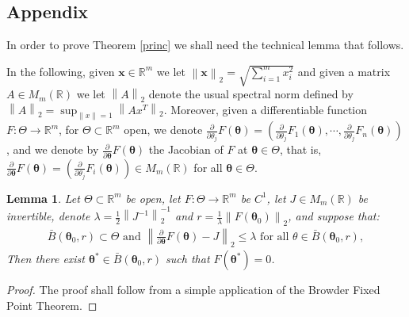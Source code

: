 \documentclass[10pt,a4paper,onecolumn]{article} %
\newtheorem{lemma}[theorem]{Lemma}
\newcommand{\R}{\mathbb{R}}
\newcommand{\bs}{\boldsymbol}
\begin{document}
\begin{appendix}

\section*{Appendix}
In order to prove Theorem \ref{princ} we shall need the technical lemma that follows.

In the following, given $\bs{x}\in \R^m$ we let $\left\|\bs{x}\right\|_2=\sqrt{\sum_{i=1}^m x_i^2}$ and given a matrix $A\in M_m(\R)$ we let $\left\|A\right\|_2$ denote the usual spectral norm defined by $\left\|A\right\|_2=\sup_{\left\|x\right\|=1}\left\|Ax^T\right\|_2$. Moreover, given a differentiable function $F:\Theta\to \mathbb{R}^m$, for $\Theta\subset \mathbb{R}^m$ open, we denote $\frac{\partial}{\partial \theta_j} F(\bs{\theta})=\left(\frac{\partial}{\partial \theta_j} F_1 (\bs{\theta}),\cdots,  \frac{\partial}{\partial \theta_j} F_n (\bs{\theta})\right)$, and we denote
 by $\frac{\partial}{\partial \bs{\theta}} F(\bs{\theta})$ the Jacobian of $F$ at $\bs{\theta}\in \Theta$, that is, $\frac{\partial}{\partial \bs{\theta}} F(\bs{\theta})=\left(\frac{\partial}{\partial \theta_j} F_i (\bs{\theta})\right)\in M_m(\mathbb{R})$ for all $\bs{\theta}\in \Theta$.
 
\begin{lemma}\label{clemma} Let $\Theta\subset \mathbb{R}^m$ be open, let $F:\Theta\to \mathbb{R}^m$ be $C^1$, let $J\in  M_m(\mathbb{R})$ be invertible, denote $\lambda = \frac{1}{2} \left\|J^{-1}\right\|_2^{-1}$ and $r=\frac{1}{\lambda}\left\|F(\bs{\theta}_0)\right\|_2$, and suppose that:
\begin{equation*}
\begin{aligned}\bar{B}(\bs{\theta}_0,r)\subset \Theta\mbox{ and }
\left\|\frac{\partial}{\partial \bs{\theta}} F(\bs{\theta})-J\right\|_2\leq \lambda \mbox{ for all }\theta\in \bar{B}(\bs{\theta}_0,r),
\end{aligned}
\end{equation*}
Then there exist $\bs{\theta}^*\in \bar{B}(\bs{\theta}_0,r)$ such that $F(\bs{\theta}^*)=0$.
\end{lemma}

 \begin{proof} The proof shall follow from a simple application of the Browder Fixed Point Theorem.


\end{proof}
\end{appendix}
\end{document}
